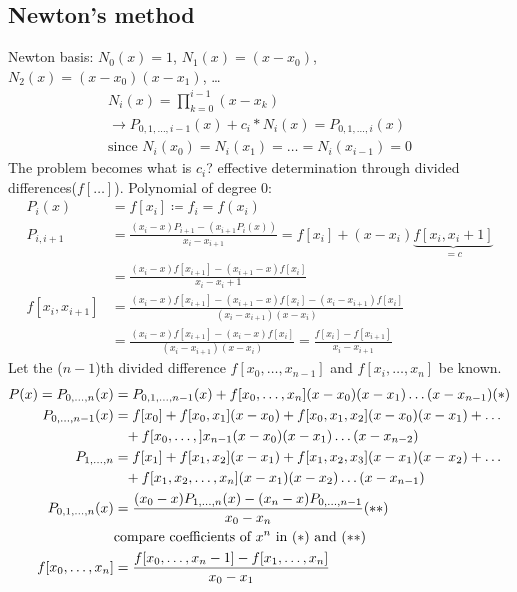 \subsection{Newton's method}\label{subsec:newton's-method}
Newton basis: $N_0 (x) = 1$, $N_1(x) =(x-x_0)$, $N_2(x)=(x-x_0)(x-x_1)$, \ldots
\begin{align*}
    N_i(x)=\prod_{k=0}^{i-1}(x-x_k)\\
    \to P_{0,1,\ldots, i-1}(x)+c_i * N_i(x) = P_{0,1,\ldots, i}(x)\\
    \text{since } N_i(x_0)=N_i(x_1)=\ldots=N_i(x_{i-1})=0
\end{align*}
The problem becomes what is $c_i$?
effective determination through divided differences($f[\ldots]$). Polynomial of degree 0:
\begin{align*}
    P_i(x) &= f[x_i] \coloneqq f_i = f(x_i)\\
    P_{i, i+1} &= \frac{(x_i - x) P_{i+1}-(x_{i+1} P_i(x))}{x_i-x_{i+1}} =f[x_i]+(x-x_i)\underbrace{f[x_i, x_i+1]}_{=c}\\
    &=\frac{(x_i-x)f[x_{i+1}]-(x_{i+1}-x) f[x_i]}{x_i-x_i+1}\\
    f[x_i, x_{i+1}] &= \frac{(x_i-x)f[x_{i+1}]-(x_{i+1}-x) f[x_i]-(x_i-x_{i+1}) f[x_i]}{(x_i-x_{i+1})(x-x_i)}\\
    &= \frac{(x_i-x)f[x_{i+1}]-(x_i-x)f[x_i]}{(x_i-x_{i+1})(x-x_i)}=\frac{f[x_i]-f[x_{i+1}]}{x_i-x_{i+1}}
\end{align*}
Let the ($n-1$)th divided difference $f[x_0, \ldots, x_{n-1}]$ and $f[x_i, \ldots, x_n]$ be known.
\begin{align*}
    P(x)=P_{0, \ldots, n}(x)&=P_{0,1,\ldots, n-1}(x)+f[x_0, \ldots, x_n](x-x_0)(x-x_1)\ldots(x-x_{n-1}) \text{(\textasteriskcentered{})}\\
    P_{0,\ldots, n-1}(x)&=f[x_0]+f[x_0, x_1](x-x_0)+f[x_0,x_1,x_2](x-x_0)(x-x_1)+
    \ldots\\
    &\phantom{=}+f[x_0,\ldots, ]x_{n-1}(x-x_0)(x-x_1)\ldots(x-x_{n-2})\\
    P_{1,\ldots, n} &= f[x_1] + f[x_1, x_2](x-x_1)+f[x_1, x_2, x_3](x-x_1)(x-x_2)+\ldots\\
    &\phantom{=}+f[x_1, x_2, \ldots, x_n] (x-x_1)(x-x_2)\ldots (x-x_{n-1})\\
    P_{0,1,\ldots, n}(x) &= \frac{(x_0-x)P_{1,\ldots, n}(x)-(x_n-x)P_{0,\ldots, n-1}}{x_0-x_n} \text{(\textasteriskcentered{}\textasteriskcentered{})}\\
    &\text{compare coefficients of $x^n$ in (\textasteriskcentered{}) and (\textasteriskcentered{}\textasteriskcentered{})}\\
    f[x_0,\ldots, x_n]&=\frac{f[x_0, \ldots, x_n-1]-f[x_1, \ldots, x_n]}{x_0-x_1}
\end{align*}
